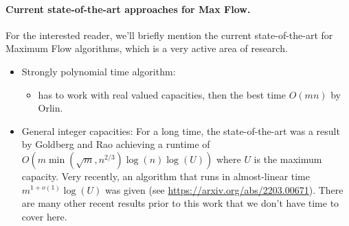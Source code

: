 \paragraph{Current state-of-the-art approaches for Max Flow.} For the
interested reader, we'll briefly mention the current state-of-the-art
for Maximum Flow algorithms, which is a  very active area of research.
\begin{itemize}
    \item Strongly polynomial time algorithm:
     \begin{itemize}
       \item has to work with real valued capacities, then the best time $O(mn)$ by Orlin.
    \end{itemize}
  \item General integer capacities: For a long time, the
    state-of-the-art was a result by Goldberg and Rao achieving a
    runtime of \(O(m \min(\sqrt{m},n^{2/3}) \log(n) \log(U) )\) where $U$ is the
    maximum capacity. Very recently, an algorithm that runs in almost-linear time $m^{1+o(1)}\log(U)$ was given (see
    \url{https://arxiv.org/abs/2203.00671}). There are many other recent results prior to this work that we don't have time to cover here. 
\end{itemize}
%







